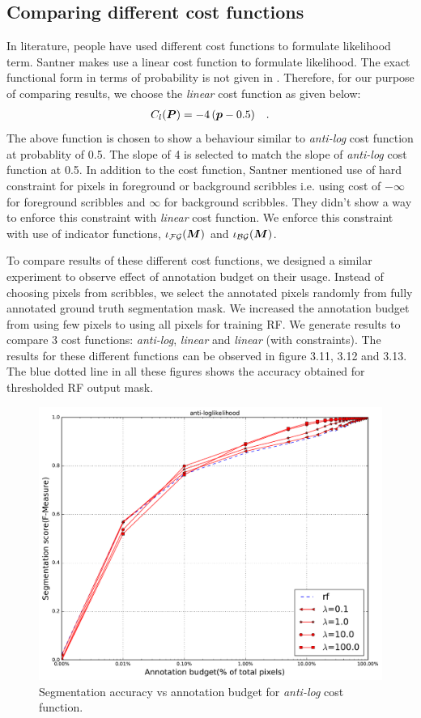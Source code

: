\subsection{Comparing different cost functions}
In literature, people have used different cost functions to formulate likelihood term.
Santner \cite{santner:2009} makes use a linear cost function to formulate likelihood. The exact functional form in terms of probability is not given in \cite{santner:2009}. Therefore, for our purpose of comparing results, we choose the \textit{linear} cost function as given below:
\begin{align*}
\mathop{{}C_l}(\boldsymbol{P}) = -4\,(\boldsymbol{p}-0.5) \quad .
\end{align*}
The above function is chosen to show a behaviour similar to \textit{anti-log} cost function at probablity of 0.5. The slope of 4 is selected to match the slope of \textit{anti-log} cost function at 0.5. In addition to the cost function, Santner \cite{santner:2009} mentioned use of hard constraint for pixels in foreground or background scribbles i.e. using cost of $-\infty$ for foreground scribbles and $\infty$ for background scribbles. They didn't show a way to enforce this constraint with \textit{linear} cost function. We enforce this constraint with use of indicator functions, $\iota_{\mathcal{FG}}(\boldsymbol{M})$ and $\iota_{\mathcal{BG}}(\boldsymbol{M})$. \par
To compare results of these different cost functions, we designed a similar experiment to observe effect of annotation budget on their usage. Instead of choosing pixels from scribbles, we select the annotated pixels randomly from fully annotated ground truth segmentation mask. We increased the annotation budget from using few pixels to using all pixels for training RF. We generate results to compare 3 cost functions: \textit{anti-log}, \textit{linear} and \textit{linear} (with constraints). The results for these different functions can be observed in figure 3.11, 3.12 and 3.13. The blue dotted line in all these figures shows the accuracy obtained for thresholded RF output mask.

\begin{figure}[h!] \label{fig:nll}
\centering
 \includegraphics[width=0.75\linewidth]{figures/anti_nll.pdf}
\caption{Segmentation accuracy vs annotation budget for \textit{anti-log} cost function.}
\end{figure}

